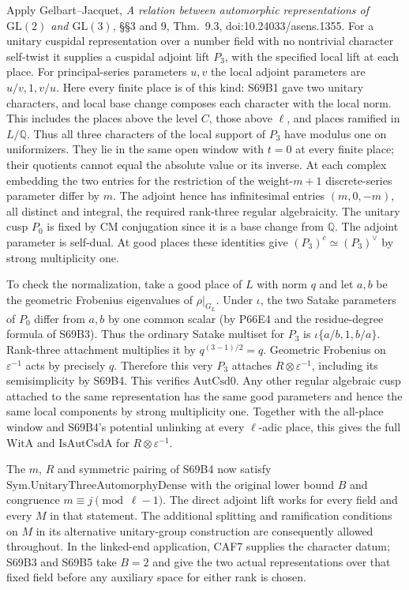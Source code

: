 Apply Gelbart--Jacquet, \emph{A relation between automorphic
representations of $\mathrm{GL}(2)$ and $\mathrm{GL}(3)$},
\S\S3 and 9, Thm.~9.3, doi:10.24033/asens.1355. For a unitary
cuspidal representation over a number field with no nontrivial
character self-twist it supplies a cuspidal adjoint lift $P_3$,
with the specified local lift at each place. For principal-series
parameters $u,v$ the local adjoint parameters are $u/v,1,v/u$.
Here every finite place is of this kind: S69B1 gave two unitary
characters, and local base change composes each character with
the local norm. This includes the places above the level $C$,
those above $\ell$, and places ramified in $L/\mathbb Q$. Thus
all three characters of the local support of $P_3$ have modulus
one on uniformizers. They lie in the same open window with
$t=0$ at every finite place; their quotients cannot equal
the absolute value or its inverse. At each complex embedding
the two entries for the restriction of the weight-$m+1$
discrete-series parameter differ by $m$. The adjoint hence has
infinitesimal entries $(m,0,-m)$, all distinct and integral,
the required rank-three regular algebraicity. The unitary cusp
$P_0$ is fixed by CM conjugation since it is a base change from
$\mathbb Q$. The adjoint parameter is self-dual. At good places
these identities give $(P_3)^c\simeq(P_3)^\vee$ by strong
multiplicity one.

To check the normalization, take a good place of $L$ with norm
$q$ and let $a,b$ be the geometric Frobenius eigenvalues of
$\rho|_{G_L}$. Under $\iota$, the two Satake parameters of
$P_0$ differ from $a,b$ by one common scalar
(by P66E4 and the residue-degree formula of S69B3). Thus
the ordinary Satake multiset for $P_3$ is
$\iota\{a/b,1,b/a\}$. Rank-three attachment multiplies it by
$q^{(3-1)/2}=q$. Geometric Frobenius on $\varepsilon^{-1}$ acts
by precisely $q$. Therefore this very $P_3$ attaches
$R\otimes\varepsilon^{-1}$, including its semisimplicity by
S69B4. This verifies $\mathrm{AutCsd0}$. Any other regular
algebraic cusp attached to the same representation has the same
good parameters and hence the same local components by strong
multiplicity one. Together with the all-place window and
S69B4's potential unlinking at every $\ell$-adic place, this gives
the full $\mathrm{WitA}$ and $\mathrm{IsAutCsdA}$ for
$R\otimes\varepsilon^{-1}$.

The $m$, $R$ and symmetric pairing of S69B4 now satisfy
$\mathrm{Sym.UnitaryThreeAutomorphyDense}$ with the original
lower bound $B$ and congruence $m\equiv j\pmod{\ell-1}$.
The direct adjoint lift works for every field and every $M$ in
that statement. The additional splitting and ramification
conditions on $M$ in its alternative unitary-group construction
are consequently allowed throughout. In the linked-end
application, CAF7 supplies the character datum; S69B3 and S69B5
take $B=2$ and give the two actual representations over that
fixed field before any auxiliary space for either rank is chosen.
